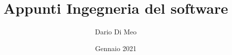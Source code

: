 \documentclass[a4paper,11pt]{article}
\title{\textbf{Appunti Ingegneria del software}}
\author{Dario Di Meo}
\date{Gennaio 2021}
\begin{document}
\newcommand{\sw}[0]{software}
\newcommand{\Sw}[0]{Software}
\maketitle
\tableofcontents
\newpage

\newpage

\newpage

\newpage

\newpage
\end{document}
